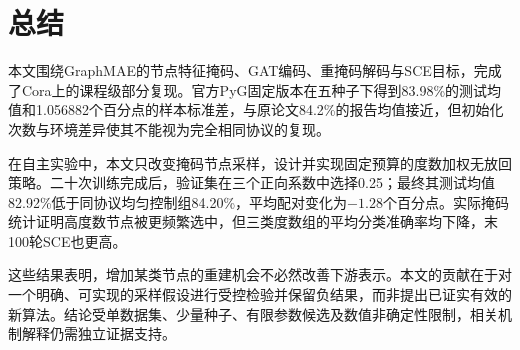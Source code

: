 \section{总结}\label{sec:conclusion}
本文围绕GraphMAE的节点特征掩码、GAT编码、重掩码解码与SCE目标，完成了Cora上的课程级部分复现。官方PyG固定版本在五种子下得到83.98\%的测试均值和1.056882个百分点的样本标准差，与原论文84.2\%的报告均值接近，但初始化次数与环境差异使其不能视为完全相同协议的复现。

在自主实验中，本文只改变掩码节点采样，设计并实现固定预算的度数加权无放回策略。二十次训练完成后，验证集在三个正向系数中选择0.25；最终其测试均值82.92\%低于同协议均匀控制组84.20\%，平均配对变化为$-1.28$个百分点。实际掩码统计证明高度数节点被更频繁选中，但三类度数组的平均分类准确率均下降，末100轮SCE也更高。

这些结果表明，增加某类节点的重建机会不必然改善下游表示。本文的贡献在于对一个明确、可实现的采样假设进行受控检验并保留负结果，而非提出已证实有效的新算法。结论受单数据集、少量种子、有限参数候选及数值非确定性限制，相关机制解释仍需独立证据支持。
